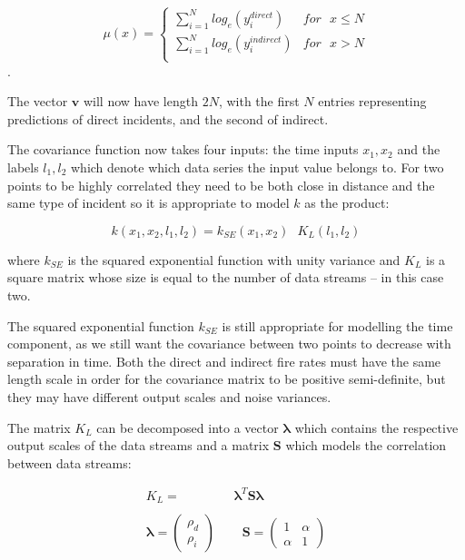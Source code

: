 \documentclass[a4paper,11pt]{report}
\begin{document}
\begin{equation} \label{eq:LGCPCmean}
\mu (x) = \begin{cases}  
\displaystyle \sum_{i=1}^{N} log_e(y_i^{direct}) & for \text{ }x\le N \\
\displaystyle \sum_{i=1}^{N}log_e(y_i^{indirect}) & for \text{ }x>N \\ \end{cases}
\end{equation}.

The vector \(\mathbf{v}\) will now have length \(2N\), with the first \(N\) entries representing predictions of direct incidents, and the second of indirect. \par

The covariance function now takes four inputs: the time inputs \(x_1, x_2\) and the labels \(l_1,l_2\) which denote which data series the input value belongs to. For two points to be highly correlated they need to be both close in distance and the same type of incident so it is appropriate to model \(k\) as the product: 

\begin{equation} \label{eq:LGCPCcov}
k(x_1,x_2,l_1,l_2) = k_{SE}(x_1,x_2) \text{ } K_L(l_1,l_2) 
\end{equation}

where \(k_{SE}\) is the squared exponential function with unity variance and \(K_L\) is a square matrix whose size is equal to the number of data streams -- in this case two. \par

The squared exponential function \(k_{SE}\) is still appropriate for modelling the time component, as we still want the covariance between two points to decrease with separation in time. Both the direct and indirect fire rates must have the same length scale in order for the covariance matrix to be positive semi-definite, but they may have different output scales and noise variances.

The matrix \(K_L\) can be decomposed into a vector \(\boldsymbol{\lambda}\) which contains the respective output scales of the data streams and a matrix \(\mathbf{S}\) which models the correlation between data streams:

\singlespacing
\begin{equation} \label{eq:KL-decomp}
\begin{aligned}
K_L =& \boldsymbol{\lambda}^T \mathbf{S} \boldsymbol{\lambda} \\ \\
\boldsymbol{\lambda} = \left( \begin{array}{cc}
\rho_d  \\
\rho_i \end{array} \right)\text{ } & \text{ }
\mathbf{S} = \left( \begin{array}{cc}
1 & \alpha  \\
\alpha  & 1 \end{array} \right)
\end{aligned}
\end{equation}
\doublespacing
\end{document}
